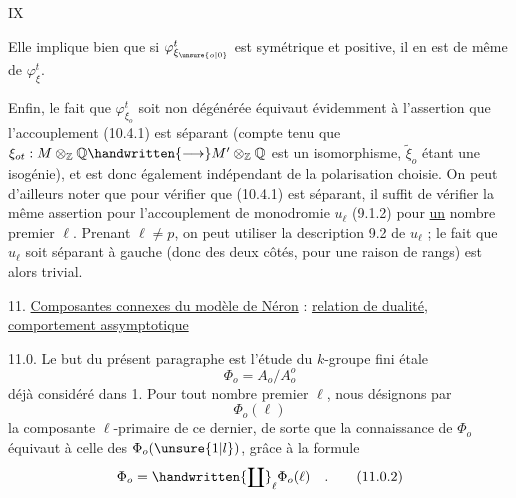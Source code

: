 \hfill IX

Elle implique bien que si $\varphi^t_{\xi_{\unsure{o|0}}}$ est symétrique et positive, il en est de même de $\varphi^t_\xi$.

Enfin, le fait que $\varphi^t_{\xi_o}$ soit non dégénérée équivaut évidemment à l'assertion que l'accouplement (10.4.1) est séparant (compte tenu que $\xi_{ot}:M\otimes_{\mathbb{Z}}\mathbb{Q}\handwritten{\longrightarrow}M'\otimes_{\mathbb{Z}}\mathbb{Q}$ est un isomorphisme, $\widetilde{\xi}_o$ étant une isogénie), et est donc également indépendant de la polarisation choisie. On peut d'ailleurs noter que pour vérifier que (10.4.1) est séparant, il suffit de vérifier la même assertion pour l'accouplement de monodromie $u_\ell$ (9.1.2) pour \uline{un} nombre premier $\ell$. Prenant $\ell\ne p$, on peut utiliser la description 9.2 de $u_\ell$ ; le fait que $u_\ell$ soit séparant à gauche (donc des deux côtés, pour une raison de rangs) est alors trivial.

11. \uline{Composantes connexes du modèle de Néron} : \uline{relation de dualité}, \uline{comportement assymptotique}

11.0. Le but du présent paragraphe est l'étude du $k$-groupe fini étale
\[
 \Phi_o=A_o/A_o^o\tag*{(11.0.1)}
\]
déjà considéré dans 1. Pour tout nombre premier $\ell$, nous désignons par
\[
 \Phi_o(\ell)
\]
la composante $\ell$-primaire de ce dernier, de sorte que la connaissance de $\Phi_o$ équivaut à celle des $\Phi_o(\unsure{1|l})$, grâce à la formule
\[
 \Phi_o=\handwritten{\coprod}_{\ell}\Phi_o(\ell)\quad .\tag*{(11.0.2)}
\]

